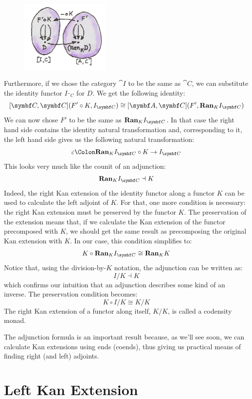 \begin{figure}[H]
  \centering
  \includegraphics[width=0.4\textwidth]{images/kan92.jpg}
\end{figure}

\noindent
Furthermore, if we chose the category $\cat{I}$ to be the same as
$\cat{C}$, we can substitute the identity functor $I_{\cat{C}}$ for
$D$. We get the following identity:
\[[\cat{C}, \cat{C}](F' \circ K, I_{\cat{C}}) \cong [\cat{A}, \cat{C}](F', \Ran_{K}I_{\cat{C}})\]
We can now chose $F'$ to be the same as $\Ran_{K}I_{\cat{C}}$. In
that case the right hand side contains the identity natural
transformation and, corresponding to it, the left hand side gives us the
following natural transformation:
\[\varepsilon \Colon \Ran_{K}I_{\cat{C}} \circ K \to I_{\cat{C}}\]
This looks very much like the counit of an adjunction:
\[\Ran_{K}I_{\cat{C}} \dashv K\]
Indeed, the right Kan extension of the identity functor along a functor
$K$ can be used to calculate the left adjoint of $K$. For
that, one more condition is necessary: the right Kan extension must be
preserved by the functor $K$. The preservation of the extension
means that, if we calculate the Kan extension of the functor precomposed
with $K$, we should get the same result as precomposing the
original Kan extension with $K$. In our case, this condition
simplifies to:
\[K \circ \Ran_{K}I_{\cat{C}} \cong \Ran_{K}K\]
Notice that, using the division-by-$K$ notation, the adjunction can be
written as:
\[I/K \dashv K\]
which confirms our intuition that an adjunction describes some kind of
an inverse. The preservation condition becomes:
\[K \circ I/K \cong K/K\]
The right Kan extension of a functor along itself, $K/K$, is
called a codensity monad.

The adjunction formula is an important result because, as we'll see
soon, we can calculate Kan extensions using ends (coends), thus giving
us practical means of finding right (and left) adjoints.

\section{Left Kan Extension}

